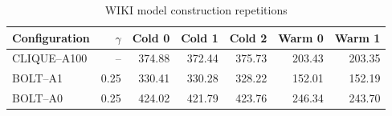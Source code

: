 \begin{table}[H]
\centering
\small
\setlength{\tabcolsep}{5pt}
\caption{WIKI model construction repetitions}
\label{tab:E_repetitions_WIKI}
\begin{tabular}{@{}lrrrrrr@{}}
\toprule
Configuration & $\gamma$ & Cold 0 & Cold 1 & Cold 2 & Warm 0 & Warm 1 \\
\midrule
CLIQUE--A100 & -- & 374.88 & 372.44 & 375.73 & 203.43 & 203.35 \\
BOLT--A1 & 0.25 & 330.41 & 330.28 & 328.22 & 152.01 & 152.19 \\
BOLT--A0 & 0.25 & 424.02 & 421.79 & 423.76 & 246.34 & 243.70 \\
\bottomrule
\end{tabular}
\end{table}

